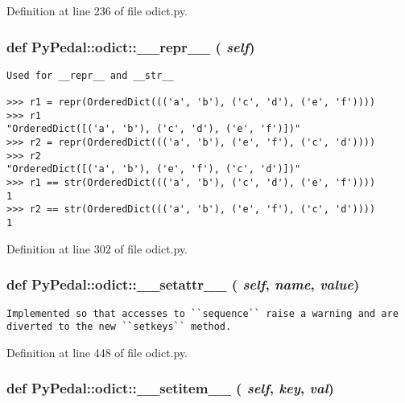 Definition at line 236 of file odict.py.\hypertarget{namespacePyPedal_1_1odict_dfe57eeb9c9a285323fbe7ee52c7e114}{
\subsubsection{\setlength{\rightskip}{0pt plus 5cm}def PyPedal::odict::\_\-\_\-repr\_\-\_\- ( {\em self})}}
\label{namespacePyPedal_1_1odict_dfe57eeb9c9a285323fbe7ee52c7e114}




\footnotesize\begin{verbatim}
Used for __repr__ and __str__

>>> r1 = repr(OrderedDict((('a', 'b'), ('c', 'd'), ('e', 'f'))))
>>> r1
"OrderedDict([('a', 'b'), ('c', 'd'), ('e', 'f')])"
>>> r2 = repr(OrderedDict((('a', 'b'), ('e', 'f'), ('c', 'd'))))
>>> r2
"OrderedDict([('a', 'b'), ('e', 'f'), ('c', 'd')])"
>>> r1 == str(OrderedDict((('a', 'b'), ('c', 'd'), ('e', 'f'))))
1
>>> r2 == str(OrderedDict((('a', 'b'), ('e', 'f'), ('c', 'd'))))
1
\end{verbatim}
\normalsize
 

Definition at line 302 of file odict.py.\hypertarget{namespacePyPedal_1_1odict_596cea3c32886770dfcdf57d64db09fa}{
\subsubsection{\setlength{\rightskip}{0pt plus 5cm}def PyPedal::odict::\_\-\_\-setattr\_\-\_\- ( {\em self},  {\em name},  {\em value})}}
\label{namespacePyPedal_1_1odict_596cea3c32886770dfcdf57d64db09fa}




\footnotesize\begin{verbatim}
Implemented so that accesses to ``sequence`` raise a warning and are
diverted to the new ``setkeys`` method.
\end{verbatim}
\normalsize
 

Definition at line 448 of file odict.py.\hypertarget{namespacePyPedal_1_1odict_a5e4184ecd50c5c8272865538da01318}{
\subsubsection{\setlength{\rightskip}{0pt plus 5cm}def PyPedal::odict::\_\-\_\-setitem\_\-\_\- ( {\em self},  {\em key},  {\em val})}}
\label{namespacePyPedal_1_1odict_a5e4184ecd50c5c8272865538da01318}




